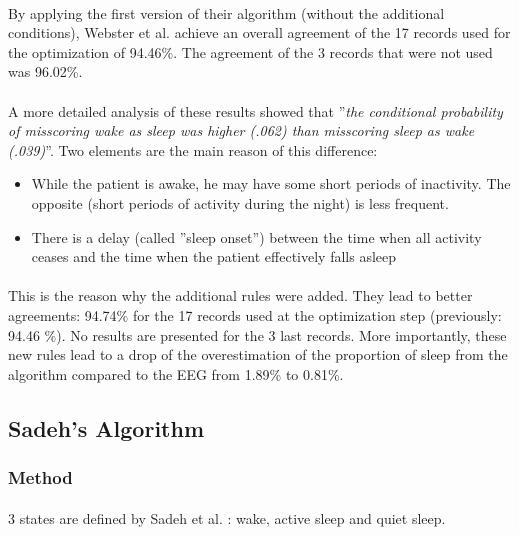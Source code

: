 \documentclass[a4paper,12pt]{article}
\begin{document}
\paragraph{}
By applying the first version of their algorithm (without the additional conditions), Webster et al. achieve an overall agreement of the 17 records used for the optimization of 94.46\%. The agreement of the 3 records that were not used was 96.02\%.

\paragraph{}
A more detailed analysis of these results showed that ''\textit{the conditional probability of misscoring wake as sleep was higher (.062) than misscoring sleep as wake (.039)}''\cite{Webster1982}. Two elements are the main reason of this difference:

\begin{itemize}
\item While the patient is awake, he may have some short periods of inactivity. The opposite (short periods of activity during the night) is less frequent.
\item There is a delay (called ''sleep onset'') between the time when all activity ceases and the time when the patient effectively falls asleep
\end{itemize}

\paragraph{}
This is the reason why the additional rules were added. They lead to better agreements: 94.74\% for the 17 records used at the optimization step (previously: 94.46 \%). No results are presented for the 3 last records.
More importantly, these new rules lead to a drop of the overestimation of the proportion of sleep from the algorithm compared to the EEG from 1.89\% to 0.81\%.

\subsection{Sadeh's Algorithm}
\label{subsec:sadeh}

\subsubsection{Method}

\paragraph{}
3 states are defined by Sadeh et al. \cite{Sadeh1995} : wake, active sleep and quiet sleep. \\
\end{document}
